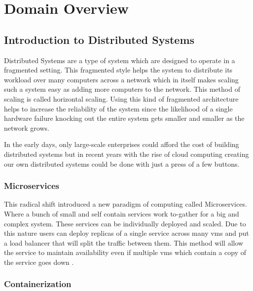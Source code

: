 \section{Domain Overview}

\subsection{Introduction to Distributed Systems}

Distributed Systems are a type of system which are designed to operate in a fragmented setting. This fragmented style helps the system to distribute its workload over many computers across a network which in itself makes scaling such a system easy as adding more computers to the network. This method of scaling is called horizontal scaling. Using this kind of fragmented architecture helps to increase the reliability of the system since the likelihood of a single hardware failure knocking out the entire system gets smaller and smaller as the network grows.

In the early days, only large-scale enterprises could afford the cost of building distributed systems but in recent years with the rise of cloud computing \citep{CloudAdo16:online} creating our own distributed systems could be done with just a press of a few buttons.

\subsubsection{Microservices} \label{sec:intro-microservices}

This radical shift introduced a new paradigm of computing called Microservices. Where a bunch of small and self contain services work to-gather for a big and complex system. These services can be individually deployed and scaled. Due to this nature users can deploy replicas of a single service across many \acp{vm} and put a load balancer that will split the traffic between them. This method will allow the service to maintain availability even if multiple \acp{vm} which contain a copy of the service goes down \citep{chaczko2011availability}.

\subsubsection{Containerization}


